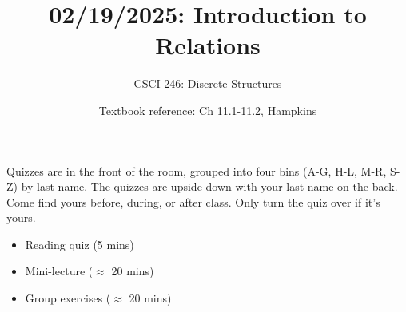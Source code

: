 \documentclass[10pt]{beamer}
\begin{document}






\title{02/19/2025: Introduction to Relations}
\author{CSCI 246: Discrete Structures}
\date{Textbook reference: Ch 11.1-11.2, Hampkins}

\begin{frame}
    \titlepage 
\end{frame}


\begin{frame}
\footnotesize 
\begin{mygreenbox}[title=Graded Quiz Pickup]
Quizzes are in the front of the room, grouped into four bins (A-G, H-L, M-R, S-Z) by last name. The quizzes are upside down with your last name on the back. Come find yours before, during, or after class.  Only turn the quiz over if it's yours.
\end{mygreenbox} 
\vfill 

%
%
%


\begin{myyellowbox}[title=Today's Agenda]
\begin{itemize}
	\item Reading quiz (5 mins)
	\item Mini-lecture ($\approx$ 20 mins)
	\item Group exercises ($\approx$ 20 mins)
\end{itemize}

\end{myyellowbox}
\vfill 

\end{frame}
\end{document}
